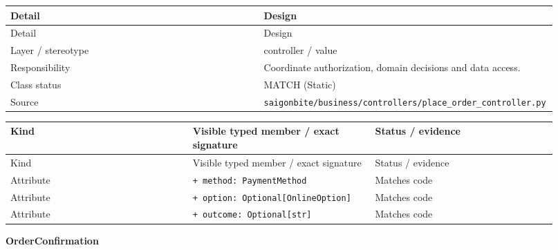 \begin{longtable}{>{\raggedright\arraybackslash}p{0.4600\linewidth}>{\raggedright\arraybackslash}p{0.4600\linewidth}}
Detail & Design \\
\hline\endfirsthead
Detail & Design \\
\hline\endhead
Layer / stereotype & controller / \guillemotleft{}value\guillemotright{} \\
Responsibility & Coordinate authorization, domain decisions and data access. \\
Class status & MATCH (Static) \\
Source & \texttt{saigonbite/\allowbreak{}business/\allowbreak{}controllers/\allowbreak{}place\_\allowbreak{}order\_\allowbreak{}controller.\allowbreak{}py} \\
\end{longtable}
\begin{longtable}{>{\raggedright\arraybackslash}p{0.3067\linewidth}>{\raggedright\arraybackslash}p{0.3067\linewidth}>{\raggedright\arraybackslash}p{0.3067\linewidth}}
Kind & Visible typed member / exact signature & Status / evidence \\
\hline\endfirsthead
Kind & Visible typed member / exact signature & Status / evidence \\
\hline\endhead
Attribute & \texttt{+ method: PaymentMethod} & Matches code \\
Attribute & \texttt{+ option: Optional[OnlineOption]} & Matches code \\
Attribute & \texttt{+ outcome: Optional[str]} & Matches code \\
\end{longtable}
\textbf{OrderConfirmation}

